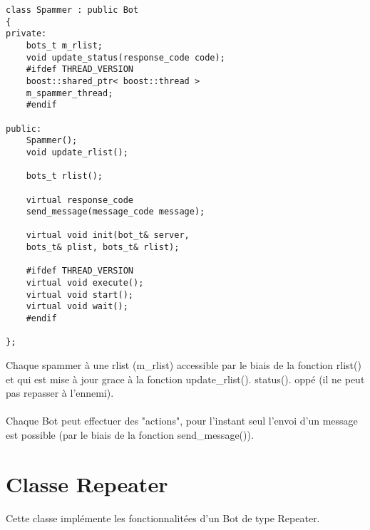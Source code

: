 \documentclass[11pt]{article}
\begin{document}
\begin{minipage}[c]{.46\linewidth}
\begin{verbatim} 
class Spammer : public Bot
{
private:
	bots_t m_rlist;
	void update_status(response_code code);
	#ifdef THREAD_VERSION
	boost::shared_ptr< boost::thread > 
	m_spammer_thread;
	#endif
	
public:
	Spammer();
	void update_rlist();
	
	bots_t rlist();
	
	virtual response_code 
	send_message(message_code message);
	
	virtual void init(bot_t& server, 
	bots_t& plist, bots_t& rlist);
	
	#ifdef THREAD_VERSION
	virtual void execute();
	virtual void start();
	virtual void wait();
	#endif

};
\end{verbatim}	
\end{minipage} \hfill
\begin{minipage}[c]{.46\linewidth}
Chaque spammer à une rlist (m\_rlist) accessible par le biais de la fonction rlist() et qui est mise à jour grace à la fonction update\_rlist(). status(). oppé (il ne peut pas repasser à l'ennemi).\\\\Chaque Bot peut effectuer des "actions", pour l'instant seul l'envoi d'un message est possible (par le biais de la fonction send\_message()).
\end{minipage}

\newpage
\section{Classe Repeater}
Cette classe implémente les fonctionnalitées d'un Bot de type Repeater.\\
\end{document}
